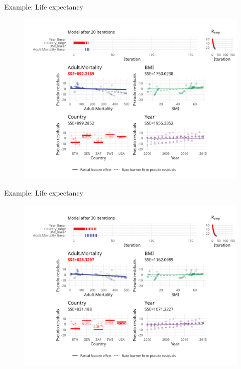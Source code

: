 \begin{frame}{Example: Life expectancy}
	\begin{figure}
		\centering
		\includegraphics[width=\textwidth]{figure/cwb-anim/fig-iter-0020.png}
	\end{figure}
	\addtocounter{framenumber}{-1}
\end{frame}


\begin{frame}{Example: Life expectancy}
	\begin{figure}
		\centering
		\includegraphics[width=\textwidth]{figure/cwb-anim/fig-iter-0030.png}
	\end{figure}
	\addtocounter{framenumber}{-1}
\end{frame}


